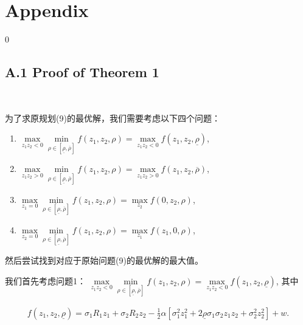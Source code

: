 \documentclass[10.0pt]{article}
\begin{document}
\section*{Appendix}
\renewcommand{\theequation}{A.\arabic{equation}}
\setcounter{equation}0

\subsection*{A.1 \quad Proof of Theorem 1}

\quad \ 

为了求原规划(9)的最优解，我们需要考虑以下四个问题：

\begin{enumerate}
\item $ \max\limits_{z_1 z_2 < 0} \min\limits_{\rho \in [\underline{\rho}, \overline{\rho}]} f (z_1, z_2, \rho) = \max\limits_{z_1 z_2 < 0} f (z_1, z_2, \underline{\rho}) $,
\item $ \max\limits_{z_1 z_2 > 0} \min\limits_{\rho \in [\underline{\rho}, \overline{\rho}]} f (z_1, z_2, \rho) = \max\limits_{z_1 z_2 > 0} f (z_1, z_2, \overline{\rho}) $,
\item $ \max\limits_{z_1 = 0} \min\limits_{\rho \in [\underline{\rho}, \overline{\rho}]} f (z_1, z_2, \rho) = \max\limits_{z_2} f (0, z_2, \rho) $,
\item $ \max\limits_{z_2 = 0} \min\limits_{\rho \in [\underline{\rho}, \overline{\rho}]} f (z_1, z_2, \rho) = \max\limits_{z_1} f (z_1, 0, \rho) $,
\end{enumerate}

然后尝试找到对应于原始问题(9)的最优解的最大值。

我们首先考虑问题1： $ \max\limits_{z_1 z_2 < 0} \min\limits_{\rho \in [\underline{\rho}, \overline{\rho}]} f (z_1, z_2, \rho) = \max\limits_{z_1 z_2 < 0} f (z_1, z_2, \underline{\rho}) $, 其中

\begin{eqnarray*}
f (z_1, z_2, \underline{\rho}) = \sigma_1 R_1 z_1 + \sigma_2 R_2 z_2 - \frac12 \alpha [\sigma_1^2 z_1^2 + 2 \underline{\rho} \sigma_1 \sigma_2 z_1 z_2 + \sigma_2^2 z_2^2] + w.
\end{eqnarray*}
\end{document}
